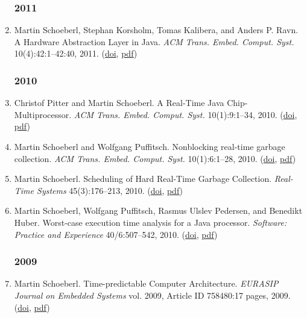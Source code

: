 \begin{enumerate}
\subsubsection*{2011}

\item Martin Schoeberl, Stephan Korsholm, Tomas Kalibera, and Anders P. Ravn.
 A Hardware Abstraction Layer in Java.
 \emph{ACM Trans. Embed. Comput. Syst.} 10(4):42:1--42:40, 2011.
(\href{http://dx.doi.org/10.1145/2043662.2043666}{doi}, \href{http://www.jopdesign.com/doc/jhal.pdf}{pdf})


\subsubsection*{2010}

\item Christof Pitter and Martin Schoeberl.
 A Real-Time Java Chip-Multiprocessor.
 \emph{ACM Trans. Embed. Comput. Syst.} 10(1):9:1--34, 2010.
(\href{http://dx.doi.org/10.1145/1814539.1814548}{doi}, \href{http://www.jopdesign.com/doc/jopcmp_tecs.pdf}{pdf})

\item Martin Schoeberl and Wolfgang Puffitsch.
 Nonblocking real-time garbage collection.
 \emph{ACM Trans. Embed. Comput. Syst.} 10(1):6:1--28, 2010.
(\href{http://dx.doi.org/10.1145/1814539.1814545}{doi}, \href{http://www.jopdesign.com/doc/nbgc.pdf}{pdf})

\item Martin Schoeberl.
 Scheduling of Hard Real-Time Garbage Collection.
 \emph{Real-Time Systems} 45(3):176--213, 2010.
(\href{http://dx.doi.org/10.1007/s11241-010-9095-4}{doi}, \href{http://www.jopdesign.com/doc/hrtsgc.pdf}{pdf})

\item Martin Schoeberl, Wolfgang Puffitsch, Rasmus Ulslev Pedersen, and Benedikt Huber.
 Worst-case execution time analysis for a Java processor.
 \emph{Software: Practice and Experience} 40/6:507--542, 2010.
(\href{http://dx.doi.org/10.1002/spe.968}{doi}, \href{http://www.jopdesign.com/doc/wcetana.pdf}{pdf})


\subsubsection*{2009}

\item Martin Schoeberl.
 Time-predictable Computer Architecture.
 \emph{EURASIP Journal on Embedded Systems} vol. 2009, Article ID 758480:17 pages, 2009.
(\href{http://dx.doi.org/10.1155/2009/758480}{doi}, \href{http://www.jopdesign.com/doc/ca4rts.pdf}{pdf})


\end{enumerate}
